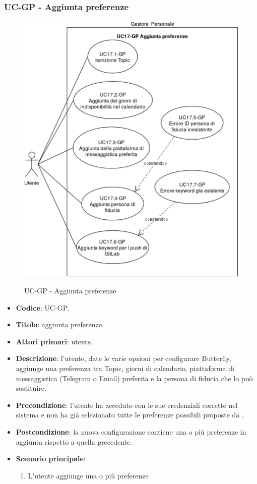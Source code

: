 \subsubsection{UC\theuccount-GP - Aggiunta preferenze}
		\begin{figure}[H]
			\centering
				\includegraphics[width=1\textwidth]{img/casi_d'uso/UC17.png}\\
			\caption{UC\theuccount-GP - Aggiunta preferenze}
		\end{figure}
	\begin{itemize}
		\item \textbf{Codice}: UC\theuccount-GP.
		\item \textbf{Titolo}: aggiunta preferenze.
		\item \textbf{Attori primari}: utente.
		\item \textbf{Descrizione}: l’utente, date le varie opzioni per configurare Butterfly, aggiunge una
		preferenza tra Topic, giorni di calendario, piattaforma di messaggistica (Telegram o Email)	preferita e la persona di fiducia che lo può sostituire.
		\item \textbf{Precondizione}: l’utente ha acceduto con le sue credenziali corrette nel sistema e non ha già selezionato tutte le preferenze possibili proposte da \progetto.
		\item \textbf{Postcondizione}: la nuova configurazione contiene una o più preferenze in aggiunta rispetto a quella precedente.
		\item \textbf{Scenario principale}:
		\begin{enumerate}
			\item L'utente aggiunge una o più preferenze
		\end{enumerate}
	\end{itemize}

